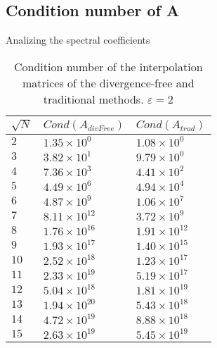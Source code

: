 \documentclass{beamer}
\begin{document}
\subsection{Condition number of A}
\begin{frame}{Analizing the spectral coefficients}
  \begin{table}[hptb]
    \begin{center}
      \begin{tabular}{l||l|l}
        \multicolumn{1}{c||}{$\sqrt{N}$} & 
	\multicolumn{1}{c}{$Cond(A_{divFree})$} & 
	\multicolumn{1}{c}{$Cond(A_{trad})$} \\
        \hline \hline
        $2$ & $1.35\times 10^{0}$ & $1.08\times 10^{0}$ \\
        $3$ & $3.82\times 10^{1}$ & $9.79\times 10^{0}$ \\
        $4$ & $7.36\times 10^{3}$ & $4.41\times 10^{2}$ \\
        $5$ & $4.49\times 10^{6}$ & $4.94\times 10^{4}$ \\
        $6$ & $4.87\times 10^{9}$ & $1.06\times 10^{7}$ \\
        $7$ & $8.11\times 10^{12}$ & $3.72\times 10^{9}$ \\
        $8$ & $1.76\times 10^{16}$ & $1.91\times 10^{12}$ \\
        $9$ & $1.93\times 10^{17}$ & $1.40\times 10^{15}$ \\
        $10$ & $2.52\times 10^{18}$ & $1.23\times 10^{17}$ \\
        $11$ & $2.33\times 10^{19}$ & $5.19\times 10^{17}$ \\
        $12$ & $5.04\times 10^{18}$ & $1.81\times 10^{19}$ \\
        $13$ & $1.94\times 10^{20}$ & $5.43\times 10^{18}$ \\
        $14$ & $4.72\times 10^{19}$ & $8.88\times 10^{18}$ \\
        $15$ & $2.63\times 10^{19}$ & $5.45\times 10^{19}$   
    \end{tabular}
    \end{center}
    \caption{Condition number of the interpolation matrices of the 
    divergence-free and traditional methods. $\varepsilon = 2$}
  \end{table}
\end{frame}
\end{document}
